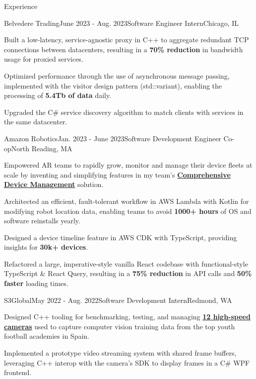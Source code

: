 \documentclass{resume}
\begin{document}
  \begin{rSection}{Experience}

    \begin{rSubsection}{Belvedere Trading}{June 2023 - Aug. 2023}{Software Engineer Intern}{Chicago, IL}
      \item Built a low-latency, service-agnostic proxy in C++ to aggregate redundant TCP
        connections between datacenters, resulting in a \textbf{70\% reduction} in bandwidth usage for proxied services.
      \item Optimized performance through the use of asynchronous message passing, implemented with the visitor
        design pattern (std::variant), enabling the processing of \textbf{5.4Tb of data} daily.      
      \item Upgraded the C\# service discovery algorithm to match clients with services in the same datacenter.
    \end{rSubsection}

    \begin{rSubsection}{Amazon Robotics}{Jan. 2023 - June 2023}{Software Development Engineer Co-op}{North Reading, MA}
      \item Empowered AR teams to rapidly grow, monitor and manage their device fleets at scale by inventing and simplifying
        features in my team's 
        \textbf{\href{https://www.allthingsdistributed.com/2021/07/amazon-robotics-on-aws.html}{Comprehensive Device Management}} solution. 
      \item Architected an efficient, fault-tolerant workflow in AWS Lambda with Kotlin for modifying 
        robot location data, enabling teams to avoid \textbf{1000+ hours} of OS and software reinstalls yearly.
      \item Designed a device timeline feature in AWS CDK with TypeScript, providing insights for \textbf{30k+ devices}. 
      \item Refactored a large, imperative-style vanilla React codebase with functional-style 
        TypeScript \& React Query, resulting in a \textbf{75\% reduction} in API calls and \textbf{50\% faster} loading times.
    \end{rSubsection}

    \begin{rSubsection}{S3Global}{May 2022 - Aug. 2022}{Software Development Intern}{Redmond, WA}
    \item Designed C++ tooling for benchmarking, testing, and managing 
      \textbf{\href{https://emergentvisiontec.com/}{12 high-speed cameras}} used to capture 
        computer vision training data from the top youth football academies in Spain.
      \item Implemented a prototype video streaming system with shared frame buffers, leveraging C++ interop with the camera's SDK
        to display frames in a C\# WPF frontend.
    \end{rSubsection}

  \end{rSection}
  
\end{document}

